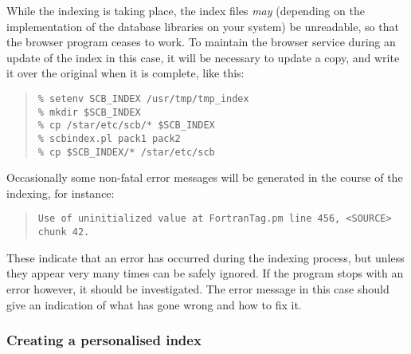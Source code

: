 \documentclass[twoside,11pt]{article}
\newcommand{\xlabel}[1]{}
\renewcommand{\_}{\texttt{\symbol{95}}}
\begin{document}
While the indexing is taking place, the index files {\it may} 
(depending on the implementation of the database libraries on
your system)
be unreadable, so that the browser program ceases to work.
To maintain the browser service during an update of the index in this
case, it will be necessary to update a copy, and write it over the
original when it is complete, like this:
\begin{quote}
\begin{verbatim}
% setenv SCB_INDEX /usr/tmp/tmp_index
% mkdir $SCB_INDEX
% cp /star/etc/scb/* $SCB_INDEX
% scbindex.pl pack1 pack2
% cp $SCB_INDEX/* /star/etc/scb
\end{verbatim}
\end{quote}

Occasionally some non-fatal error messages will be generated in the 
course of the indexing, for instance:
\begin{quote}
\begin{verbatim}
Use of uninitialized value at FortranTag.pm line 456, <SOURCE> chunk 42.
\end{verbatim}
\end{quote}
These indicate that an error has occurred during the indexing process,
but unless they appear very many times can be safely ignored.
If the program stops with an error however, it should be investigated.
The error message in this case should give an indication of what has
gone wrong and how to fix it.


\subsubsection{\xlabel{sec:personal}Creating a personalised index}
\end{document}
